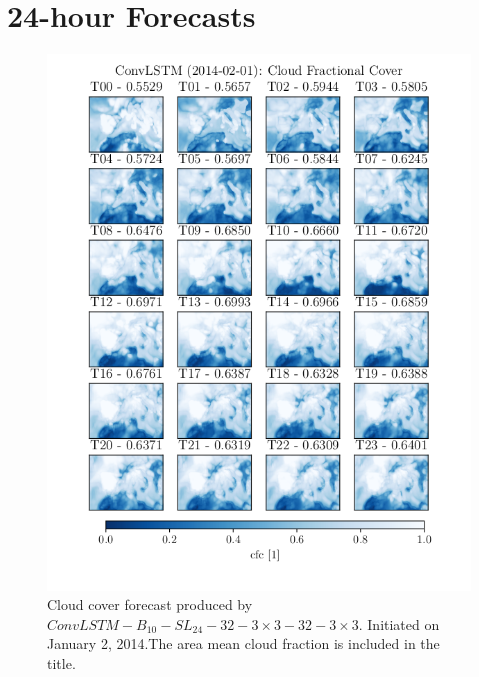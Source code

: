 \chapter{24-hour Forecasts}
\begin{figure}[ht]
    \centering
    \includegraphics{python_figs/timelapse_convlstm_24hrs_from_2014-02-01.png}
    \caption{Cloud cover forecast produced by $ConvLSTM-B_{10}-SL_{24}-32-3\times3-32-3\times3$. Initiated on January 2, 2014.The area mean cloud fraction is included in the title.}
    \label{fig:timelapse_3x3}
\end{figure}
